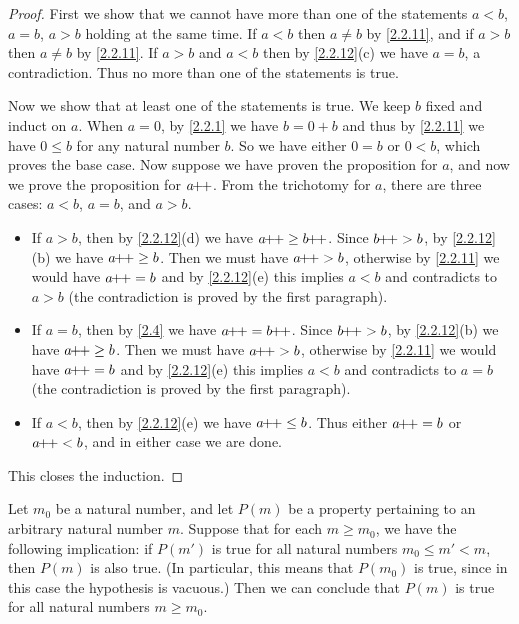 \begin{proof}
  First we show that we cannot have more than one of the statements \(a < b\), \(a = b\), \(a > b\) holding at the same time.
  If \(a < b\) then \(a \neq b\) by \cref{2.2.11}, and if \(a > b\) then \(a \neq b\) by \cref{2.2.11}.
  If \(a > b\) and \(a < b\) then by \cref{2.2.12}(c) we have \(a = b\), a contradiction.
  Thus no more than one of the statements is true.

  Now we show that at least one of the statements is true.
  We keep \(b\) fixed and induct on \(a\).
  When \(a = 0\), by \cref{2.2.1} we have \(b = 0 + b\) and thus by \cref{2.2.11} we have \(0 \leq b\) for any natural number \(b\).
  So we have either \(0 = b\) or \(0 < b\), which proves the base case.
  Now suppose we have proven the proposition for \(a\), and now we prove the proposition for \(a\!\!+\!\!+\).
  From the trichotomy for \(a\), there are three cases: \(a < b\), \(a = b\), and \(a > b\).
  \begin{itemize}
    \item If \(a > b\), then by \cref{2.2.12}(d) we have \(a\pp \geq b\pp\).
          Since \(b\!\!+\!\!+ > b\), by \cref{2.2.12}(b) we have \(a\!\!+\!\!+ \geq b\).
          Then we must have \(a\!\!+\!\!+ > b\), otherwise by \cref{2.2.11} we would have \(a\!\!+\!\!+ = b\) and by \cref{2.2.12}(e) this implies \(a < b\) and contradicts to \(a > b\)
          (the contradiction is proved by the first paragraph).
    \item If \(a = b\), then by \cref{2.4} we have \(a\pp = b\pp\).
          Since \(b\!\!+\!\!+ > b\), by \cref{2.2.12}(b) we have \(a\!\!+\!\!+ \geq b\).
          Then we must have \(a\!\!+\!\!+ > b\), otherwise by \cref{2.2.11} we would have \(a\!\!+\!\!+ = b\) and by \cref{2.2.12}(e) this implies \(a < b\) and contradicts to \(a = b\)
          (the contradiction is proved by the first paragraph).
    \item If \(a < b\), then by \cref{2.2.12}(e) we have \(a\!\!+\!\!+ \leq b\).
          Thus either \(a\!\!+\!\!+ = b\) or \(a\!\!+\!\!+ < b\), and in either case we are done.
  \end{itemize}
  This closes the induction.
\end{proof}

\begin{prop}\label{2.2.14}
  Let \(m_0\) be a natural number, and let \(P(m)\) be a property pertaining to an arbitrary natural number \(m\).
  Suppose that for each \(m \geq m_0\), we have the following implication: if \(P(m')\) is true for all natural numbers \(m_0 \leq m' < m\), then \(P(m)\) is also true.
  (In particular, this means that \(P(m_0)\) is true, since in this case the hypothesis is vacuous.)
  Then we can conclude that \(P(m)\) is true for all natural numbers \(m \geq m_0\).
\end{prop}

